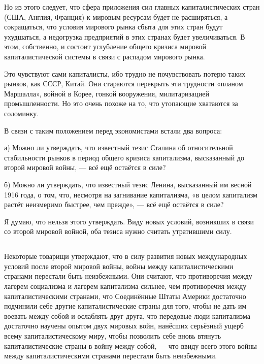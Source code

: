 \documentclass[12pt, a4paper, openany]{book}
\begin{document}
Но из этого следует, что сфера приложения сил главных капиталистических стран (США, Англия, Франция) к мировым ресурсам будет не расширяться, а сокращаться, что условия мирового рынка сбыта для этих стран будут ухудшаться, а недогрузка предприятий в этих странах будет увеличиваться. В этом, собственно, и состоит углубление общего кризиса мировой капиталистической системы в связи с распадом мирового рынка.



Это чувствуют сами капиталисты, ибо трудно не почувствовать потерю таких рынков, как СССР, Китай. Они стараются перекрыть эти трудности «планом Маршалла», войной в Корее, гонкой вооружения, милитаризацией промышленности. Но это очень похоже на то, что утопающие хватаются за соломинку.



В связи с таким положением перед экономистами встали два вопроса:



а) Можно ли утверждать, что известный тезис Сталина об относительной стабильности рынков в период общего кризиса капитализма, высказанный до второй мировой войны, — всё ещё остаётся в силе?



б) Можно ли утверждать, что известный тезис Ленина, высказанный им весной 1916 года, о том, что, несмотря на загнивание капитализма, «в целом капитализм растёт неизмеримо быстрее, чем прежде», — всё ещё остаётся в силе?



Я думаю, что нельзя этого утверждать. Виду новых условий, возникших в связи со второй мировой войной, оба тезиса нужно считать утратившими силу.



\vspace{0.4cm}



\subsection[6. Вопрос о неизбежности войн между капиталистическими странами]{}



Некоторые товарищи утверждают, что в силу развития новых международных условий после второй мировой войны, войны между капиталистическими странами перестали быть неизбежными. Они считают, что противоречия между лагерем социализма и лагерем капитализма сильнее, чем противоречия между капиталистическими странами, что Соединённые Штаты Америки достаточно подчинили себе другие капиталистические страны для того, чтобы не дать им воевать между собой и ослаблять друг друга, что передовые люди капитализма достаточно научены опытом двух мировых войн, нанёсших серьёзный ущерб всему капиталистическому миру, чтобы позволить себе вновь втянуть капиталистические страны в войну между собой, — что ввиду всего этого войны между капиталистическими странами перестали быть неизбежными.
\end{document}
